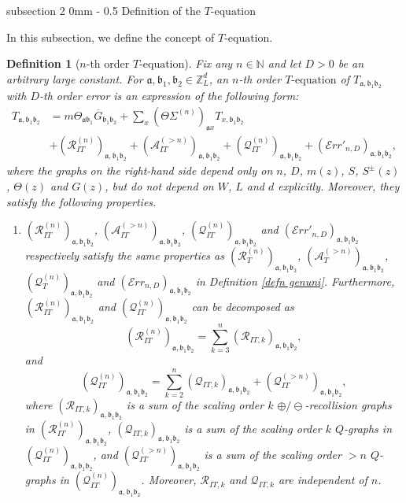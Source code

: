 \documentclass{article}
\makeatletter
\newcommand{\1}{\mathds{1}}
\numberwithin{equation}{section}
\newcommand{\be}{\begin{equation}}
\newcommand{\ee}{\end{equation}}
\newcommand{\fa}{{\mathfrak a}}
\newcommand{\fb}{{\mathfrak b}}
\renewcommand{\cal}{\mathcal}
\renewcommand{\leq}{\leqslant}
\renewcommand{\le}{\leq}
\newcommand{\N}{\mathbb{N}}
\newcommand{\Z}{\mathbb{Z}}
\DeclareMathOperator{\OO}{O}
\theoremstyle{plain} %
\newtheorem{definition}[theorem]{Definition}
\theoremstyle{remark}
\newcommand{\cor}{\color{red}}
\newcommand{\Sdelta}{{\Sigma}_T}
\newcommand{\wtSdeltan}{\Sigma^{(n)}}
\newcommand{\Incomp}{{\text{$T$-equation}}}
\newcommand{\incomp}{{\text{$T$-equation}}}
\newcommand{\PTn}{\mathcal R_T^{(n)}}
\newcommand{\PITn}{{\mathcal R_{IT}^{(n)}}}
\newcommand{\PITk}{{\mathcal R_{IT,k}}}
\newcommand{\QTn}{\mathcal Q_T^{(n)}}
\newcommand{\QITn}{{\mathcal Q_{IT}^{(n)}}}
\newcommand{\QITk}{{\mathcal Q_{IT,k}}}
\newcommand{\ATn}{\mathcal A_T^{(>n)}}
\newcommand{\AITn}{{\mathcal A_{IT}^{(>n)}}}
\newcommand{\Err}{{\mathcal Err}}
\renewcommand{\subsection}{\@startsection
{subsection}%
{2}%
{0mm}%
{-\baselineskip}%
{0.5\baselineskip}%
{\normalfont\bf\itshape}} %
\makeatother
\begin{document}
\subsection{Definition of the $\Incomp$}

In this subsection, we define the concept of \emph{$\incomp$}. 

\begin{definition} [$n$-th order $\incomp$]\label{defn incompgenuni}
Fix any $n\in \N$ and let $D>0$ be an arbitrary large constant. For $\fa, \fb_1,\fb_2 \in \Z_L^d$, an $n$-th order $\incomp$ of $T_{\fa,\fb_1\fb_2}$ with $D$-th order error is an expression of the following form: %
	\be \label{mlevelT incomplete}
	\begin{split}
		T_{\fa,\fb_1 \fb_2} &= m  \Theta_{\fa \fb_1}\overline G_{\fb_1\fb_2}   +\sum_x (\Theta \wtSdeltan)_{\fa x} T_{x,\fb_1\fb_2} \\
		&+ (\PITn)_{\fa,\fb_1 \fb_2} +  (\AITn)_{\fa,\fb_1 \fb_2} + (\QITn)_{\fa,\fb_1 \fb_2} + (\Err'_{n,D})_{\fa,\fb_1\fb_2}  ,
	\end{split}
	\ee
	where the graphs on the right-hand side depend only on $n$, $D$, $m(z)$, $S$, $S^{\pm}(z)$, $\Theta(z)$ and $G(z)$, but do not depend on $W$, $L$ and $d$ explicitly. %
	Moreover, they satisfy the following properties.
	\begin{enumerate}
		\item  $(\PITn)_{\fa,\fb_1 \fb_2}$, $(\AITn)_{\fa,\fb_1 \fb_2}$, $(\QITn)_{\fa,\fb_1 \fb_2}$ and $(\Err'_{n,D})_{\fa,\fb_1\fb_2}$ respectively satisfy the same properties as $(\PTn)_{\fa,\fb_1 \fb_2}$, $(\ATn)_{\fa,\fb_1 \fb_2}$, $(\QTn)_{\fa,\fb_1 \fb_2}$ and $(\Err_{n,D})_{\fa,\fb_1\fb_2}$ in Definition \ref{defn genuni}. Furthermore,  $(\PITn)_{\fa,\fb_1 \fb_2}$ and $(\QITn)_{\fa,\fb_1 \fb_2}$ can be decomposed as
		\be\label{decomposePIT}(\PITn)_{\fa,\fb_1\fb_2} =\sum_{ k =3}^{ n}(\PITk)_{\fa,\fb_1\fb_2},\ee
		and
		\be\label{decomposeQIT} (\QITn)_{\fa,\fb_1\fb_2}= \sum_{k=2}^{n} (\QITk)_{\fa,\fb_1\fb_2} + (\cal Q^{(>n)}_{IT})_{\fa,\fb_1\fb_2},\ee
		where  $(\PITk)_{\fa,\fb_1\fb_2}$ is a sum of the scaling order $k$ $\oplus/\ominus$-recollision graphs in $(\PITn)_{\fa,\fb_1\fb_2}$,  $(\QITk)_{\fa,\fb_1\fb_2}$ is a sum of the scaling order $k$ $Q$-graphs in $(\QITn)_{\fa,\fb_1 \fb_2}$, and $(\cal Q^{(>n)}_{IT})_{\fa,\fb_1\fb_2}$ is a sum of the scaling order $>n$ $Q$-graphs in  $(\QITn)_{\fa,\fb_1\fb_2}$.  Moreover, $\PITk$ and $\QITk$ are independent of $n$.
		

\end{enumerate}
\end{definition}
\end{document}
